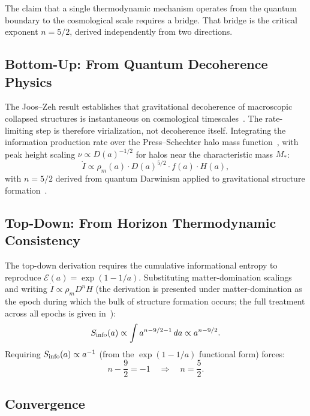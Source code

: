 \documentclass[12pt,a4paper]{article}
\begin{document}
The claim that a single thermodynamic mechanism operates from the
quantum boundary to the cosmological scale requires a bridge. That
bridge is the critical exponent $n = 5/2$, derived independently from
two directions.

\subsection{Bottom-Up: From Quantum Decoherence Physics}

The Joos--Zeh result establishes that gravitational decoherence of
macroscopic collapsed structures is instantaneous on cosmological
timescales~\citep{JoosZeh1985}. The rate-limiting step is therefore
virialization, not decoherence itself. Integrating the information
production rate over the Press--Schechter halo mass
function~\citep{PressSchechter1974}, with peak height scaling
$\nu \propto D(a)^{-1/2}$ for halos near the characteristic mass $M_*$:
\begin{equation}
\dot{I} \propto \rho_m(a)\cdot D(a)^{5/2} \cdot f(a) \cdot H(a),
\label{eq:Idot_bottomup}
\end{equation}
with $n = 5/2$ derived from quantum Darwinism applied to gravitational
structure formation~\citep{IAM_Zurek}.

\subsection{Top-Down: From Horizon Thermodynamic Consistency}

The top-down derivation requires the cumulative informational entropy to
reproduce $\mathcal{E}(a) = \exp(1-1/a)$. Substituting
matter-domination scalings and writing $\dot{I} \propto \rho_m D^n H$
(the derivation is presented under matter-domination as the epoch
during which the bulk of structure formation occurs; the full treatment
across all epochs is given in~\citep{IAM_Zurek}):
\begin{equation}
S_{\rm info}(a) \propto \int a^{n - 9/2 - 1}\,da \propto a^{n-9/2}.
\end{equation}
Requiring $S_{\rm info}(a) \propto a^{-1}$ (from the $\exp(1-1/a)$
functional form) forces:
\begin{equation}
n - \frac{9}{2} = -1 \quad\Longrightarrow\quad \boxed{n = \frac{5}{2}}.
\label{eq:n_topdown}
\end{equation}

\subsection{Convergence}
\end{document}
